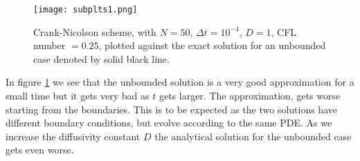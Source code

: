 \documentclass[5p,sort&compress]{elsarticle}
\numberwithin{equation}{subsection}
\begin{document}
\begin{figure}[H]
\centering
\texttt{[image: subplts1.png]} %
\caption{Crank-Nicolson scheme, with $N = 50$, $\Delta t = 10^{-4}$, $D = 1$, CFL number $= 0.25$, plotted against the exact solution for an unbounded case denoted by solid black line.}
\label{fig:subplots1}
\end{figure}
In figure \ref{fig:subplots1} we see that the unbounded solution is a very good approximation for a small time but it gets very bad as $t$ gets larger.
The approximation, gets worse starting from the boundaries. This is to be expected as the two solutions have different boundary conditions, but evolve according to the same PDE.
As we increase the diffusivity constant $D$ the analytical solution for the unbounded case gets even worse.
\end{document}
